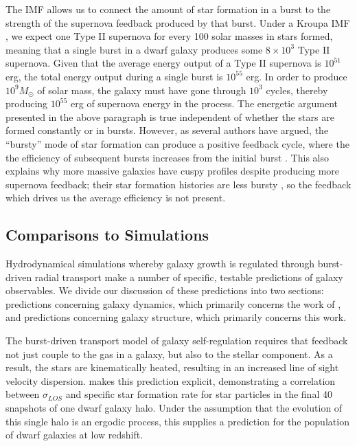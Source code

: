 \documentclass[iop]{emulateapj}
\begin{document}
The IMF allows us to connect the amount of star formation in a burst to the strength of the supernova feedback produced by that burst. Under a Kroupa IMF \citep{Kroupa02}, we expect one Type II supernova for every 100 solar masses in stars formed, meaning that a single burst in a dwarf galaxy produces some $8 \times 10^3$ Type II supernova. Given that the average energy output of a Type II supernova is $10^{51}$ erg, the total energy output during a single burst is $10^{55}$ erg. In order to produce $10^9 M_{\odot}$ of solar mass, the galaxy must have gone through $10^3$ cycles, thereby producing $10^{55}$ erg of supernova energy in the process. The energetic argument presented in the above paragraph is true independent of whether the stars are formed constantly or in bursts. However, as several authors \citep{Governato12,GK13} have argued, the ``bursty'' mode of star formation can produce a positive feedback cycle, where the the efficiency of subsequent bursts increases from the initial burst \cite[see]{}. This also explains why more massive galaxies have cuspy profiles despite producing more supernova feedback; their star formation histories are less bursty \citep{Guo16}, so the feedback which drives us the average efficiency is not present.

\subsection{Comparisons to Simulations}

Hydrodynamical simulations whereby galaxy growth is regulated through burst-driven radial transport make a number of specific, testable predictions of galaxy observables. We divide our discussion of these predictions into two sections: predictions concerning galaxy dynamics, which primarily concerns the work of \cite{Cicone16}, and predictions concerning galaxy structure, which primarily concerns this work.

The burst-driven transport model of galaxy self-regulation requires that feedback not just couple to the gas in a galaxy, but also to the stellar component. As a result, the stars are kinematically heated, resulting in an increased line of sight velocity dispersion. \cite{El-Badry17} makes this prediction explicit, demonstrating a correlation between $\sigma_{LOS}$ and specific star formation rate for star particles in the final 40 snapshots of one dwarf galaxy halo. Under the assumption that the evolution of this single halo is an ergodic process, this supplies a prediction for the population of dwarf galaxies at low redshift.
\end{document}
